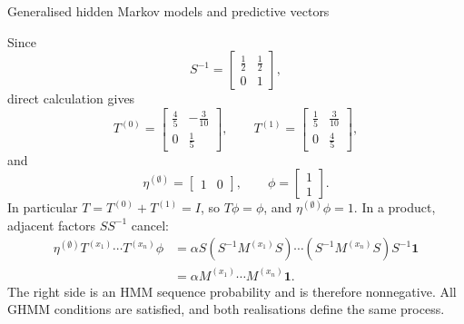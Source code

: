 \begin{exercise}[Extension]{Generalised hidden Markov models and predictive vectors}
\begin{solution}
\begin{parts}
      \item
        \begin{subparts}
          \item Since
            \[
              S^{-1}=
                \begin{bmatrix}\tfrac12&\tfrac12\\0&1\end{bmatrix},
            \]
            direct calculation gives
            \[
              T^{(0)}=
                \begin{bmatrix}\tfrac45&-\tfrac3{10}\\0&\tfrac15\end{bmatrix},
              \qquad
              T^{(1)}=
                \begin{bmatrix}\tfrac15&\tfrac3{10}\\0&\tfrac45\end{bmatrix},
            \]
            and
            \[
              \eta^{(\emptyset)}=\begin{bmatrix}1&0\end{bmatrix},
              \qquad
              \phi=\begin{bmatrix}1\\1\end{bmatrix}.
            \]
            In particular $T=T^{(0)}+T^{(1)}=I$, so $T\phi=\phi$, and
            $\eta^{(\emptyset)}\phi=1$. In a product, adjacent factors
            $SS^{-1}$ cancel:
            \[
              \begin{aligned}
                \eta^{(\emptyset)}
                  T^{(x_1)}\cdots T^{(x_n)}\phi
                  &=
                  \alpha S(S^{-1}M^{(x_1)}S)\cdots
                    (S^{-1}M^{(x_n)}S)S^{-1}\mathbf1\\
                  &=\alpha M^{(x_1)}\cdots M^{(x_n)}\mathbf1.
              \end{aligned}
            \]
            The right side is an HMM sequence probability and is therefore
            nonnegative. All GHMM conditions are satisfied, and both
            realisations define the same process.


\end{subparts}
\end{parts}
\end{solution}
\end{exercise}
